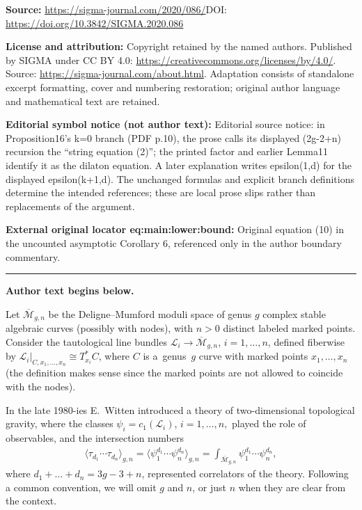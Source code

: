 \documentclass[11pt]{article}
\theoremstyle{definition}
\begin{document}
\noindent\textbf{Source:} \url{https://sigma-journal.com/2020/086/}\quad DOI: \url{https://doi.org/10.3842/SIGMA.2020.086}\par
\noindent\textbf{License and attribution:} Copyright retained by the named authors. Published by SIGMA under CC BY 4.0: \url{https://creativecommons.org/licenses/by/4.0/}. Source: \url{https://sigma-journal.com/about.html}. Adaptation consists of standalone excerpt formatting, cover and numbering restoration; original author language and mathematical text are retained.\par
\noindent\textbf{Editorial symbol notice (not author text):} Editorial source notice: in Proposition16’s k=0 branch (PDF p.10), the prose calls its displayed (2g-2+n) recursion the “string equation (2)”; the printed factor and earlier Lemma11 identify it as the dilaton equation. A later explanation writes epsilon(1,d) for the displayed epsilon(k+1,d). The unchanged formulas and explicit branch definitions determine the intended references; these are local prose slips rather than replacements of the argument.\par
\noindent\textbf{External original locator eq:main:lower:bound:} Original equation (10) in the uncounted asymptotic Corollary 6, referenced only in the author boundary commentary.\par
\medskip\hrule\medskip\noindent\textbf{Author text begins below.}\par
\setcounter{section}{1}
\setcounter{subsection}{0}
\setcounter{subsubsection}{0}
\setcounter{Theorem}{0}
\setcounter{equation}{0}
Let $\overline{\mathcal{M}}_{g,n}$ be the Deligne--Mumford
moduli space of genus $g$ complex stable algebraic curves
(possibly with nodes), with $n>0$ distinct labeled marked
points. Consider the tautological line bundles
$\mathcal{L}_i\to\overline{\mathcal{M}}_{g,n}$, $i=1,\dots,n$, defined fiberwise by
$\mathcal{L}_i|_{C,x_1,\dots,x_n} \cong
T^*_{x_i}C$, where $C$ is a~genus~$g$ curve with marked
points $x_1,\dots,x_n$ (the definition makes sense since
the marked points are not allowed to coincide with the nodes).

In the late 1980-ies E.~Witten \cite{Witten} introduced a
theory of two-dimensional topological gravity, where the
classes $\psi_i=c_1(\mathcal{L}_i)$, $i=1,\dots,n,$ played
the role of observables, and the intersection numbers
\begin{gather*}
\langle\tau_{d_1}\cdots\tau_{d_n}\rangle_{g,n}
=\big\langle\psi_1^{d_1}\cdots\psi_n^{d_n}\big\rangle_{g,n}
=\int_{\overline{\mathcal{M}}_{g,n}}
\psi_1^{d_1}\cdots\psi_n^{d_n} ,
\end{gather*}
where $d_1+\dots +d_n=3g-3+n$, represented correlators of
the theory. Following a common convention, we will omit $g$
and $n$, or just $n$ when they are clear from the context.
\end{document}

